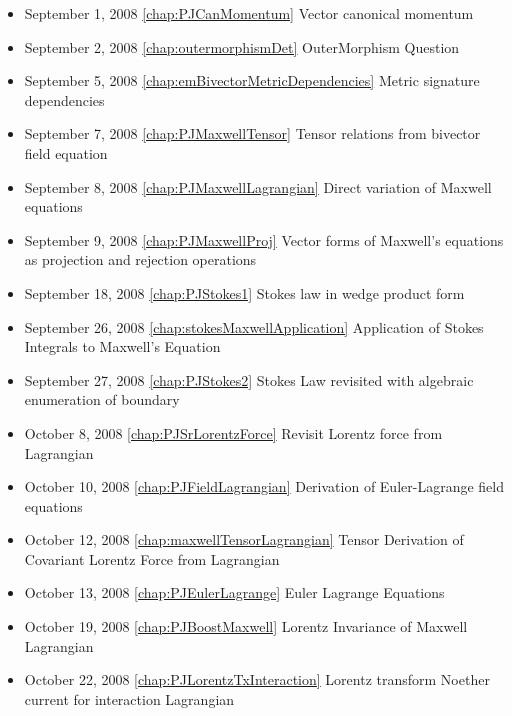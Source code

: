 \begin{itemize}
\item September 1, 2008 \ref{chap:PJCanMomentum} Vector canonical momentum

\item September 2, 2008 \ref{chap:outermorphismDet} OuterMorphism Question 

\item September 5, 2008 \ref{chap:emBivectorMetricDependencies} Metric signature dependencies

\item September 7, 2008 \ref{chap:PJMaxwellTensor} Tensor relations from bivector field equation

\item September 8, 2008 \ref{chap:PJMaxwellLagrangian} Direct variation of Maxwell equations

\item September 9, 2008 \ref{chap:PJMaxwellProj} Vector forms of Maxwell's equations as projection and rejection operations

\item September 18, 2008 \ref{chap:PJStokes1} Stokes law in wedge product form

\item September 26, 2008 \ref{chap:stokesMaxwellApplication} Application of Stokes Integrals to Maxwell's Equation

\item September 27, 2008 \ref{chap:PJStokes2} Stokes Law revisited with algebraic enumeration of boundary

\item October 8, 2008 \ref{chap:PJSrLorentzForce} Revisit Lorentz force from Lagrangian

\item October 10, 2008 \ref{chap:PJFieldLagrangian} Derivation of Euler-Lagrange field equations

\item October 12, 2008 \ref{chap:maxwellTensorLagrangian} Tensor Derivation of Covariant Lorentz Force from Lagrangian

\item October 13, 2008 \ref{chap:PJEulerLagrange} Euler Lagrange Equations

\item October 19, 2008 \ref{chap:PJBoostMaxwell} Lorentz Invariance of Maxwell Lagrangian

\item October 22, 2008 \ref{chap:PJLorentzTxInteraction} Lorentz transform Noether current for interaction Lagrangian


\end{itemize}

